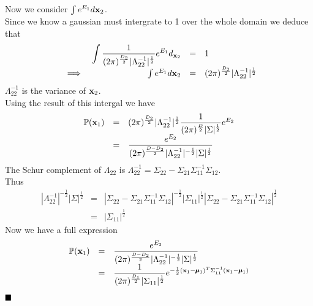 \documentclass[11pt,a4paper]{article}
\begin{document}
Now we consider $\int e^{E_1}d\textbf{x}_2$.\\
Since we know a gaussian must intergrate to 1 over the whole domain we deduce that
\[\begin{array}{rrcl}
&{\displaystyle\int\dfrac{1}{(2\pi)^{\frac{D_2}{2}}|\Lambda_{22}^{-1}|^{\frac{1}{2}}}e^{E_1}d_{\textbf{x}_2}}&=&1\\\
\implies&\int e^{E_1}d\textbf{x}_2&=&(2\pi)^{\frac{D_2}{2}}|\Lambda_{22}^{-1}|^{\frac{1}{2}}
\end{array}\]
\nb $\Lambda_{22}^{-1}$ is the variance of $\textbf{x}_2$.\\
Using the result of this intergal we have
\[\begin{array}{rcl}
\mathbb{P}(\textbf{x}_1)&=&(2\pi)^{\frac{D_2}{2}}|\Lambda_{22}^{-1}|^{\frac{1}{2}}\dfrac{1}{(2\pi)^{\frac{D}{2}}|\Sigma|^{\frac{1}{2}}}e^{E_2}\\
&=&\dfrac{e^{E_2}}{(2\pi)^{\frac{D-D_2}{2}}|\Lambda_{22}^{-1}|^{-\frac{1}{2}}|\Sigma|^{\frac{1}{2}}}
\end{array}\]
The Schur complement of $\Lambda_{22}$ is $\Lambda^{-1}_{22}=\Sigma_{22}-\Sigma_{21}\Sigma_{11}^{-1}\Sigma_{12}$.\\
Thus \[\begin{array}{rcl}
|\Lambda_{22}^{-1}|^{-\frac{1}{2}}|\Sigma|^{\frac{1}{2}}&=&|\Sigma_{22}-\Sigma_{21}\Sigma_{11}^{-1}\Sigma_{12}|^{-\frac{1}{2}}|\Sigma_{11}|^{\frac{1}{2}}|\Sigma_{22}-\Sigma_{21}\Sigma_{11}^{-1}\Sigma_{12}|^{\frac{1}{2}}\\
&=&|\Sigma_{11}|^{\frac{1}{2}}
\end{array}\]
Now we have a full expression
\[\begin{array}{rcl}
\mathbb{P}(\textbf{x}_1)&=&\dfrac{e^{E_2}}{(2\pi)^{\frac{D-D_2}{2}}|\Lambda_{22}^{-1}|^{-\frac{1}{2}}|\Sigma|^{\frac{1}{2}}}\\
&=&\dfrac{1}{(2\pi)^{\frac{D_1}{2}}|\Sigma_{11}|^{\frac{1}{2}}}e^{-\frac{1}{2}(\textbf{x}_1-\pmb{\mu}_1)^T\Sigma_{11}^{-1}(\textbf{x}_1-\pmb{\mu}_1)}
\end{array}\]
$\hfill{\blacksquare}$
\end{document}
